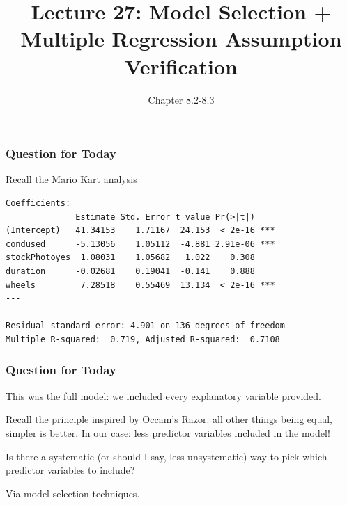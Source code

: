 \documentclass[handout]{beamer}
\title{Lecture 27: Model Selection + Multiple Regression Assumption Verification}
\author{Chapter 8.2-8.3}
\date{}
\newcommand{\blue}[1]{\textcolor{blue2}{#1}}
\begin{document}
\begin{frame}
\titlepage
\end{frame}


\begin{frame}[fragile]
\frametitle{Question for Today}
Recall the Mario Kart analysis

\begin{small}
\begin{verbatim}
Coefficients:
              Estimate Std. Error t value Pr(>|t|)    
(Intercept)   41.34153    1.71167  24.153  < 2e-16 ***
condused      -5.13056    1.05112  -4.881 2.91e-06 ***
stockPhotoyes  1.08031    1.05682   1.022    0.308    
duration      -0.02681    0.19041  -0.141    0.888    
wheels         7.28518    0.55469  13.134  < 2e-16 ***
---

Residual standard error: 4.901 on 136 degrees of freedom
Multiple R-squared:  0.719,	Adjusted R-squared:  0.7108 
\end{verbatim}
\end{small}

\end{frame}


\begin{frame}[fragile]
\frametitle{Question for Today}
This was the \blue{full model}:  we included every explanatory variable provided.

\pause
\vspace{0.5cm}

Recall the principle inspired by Occam's Razor: \blue{all other things being equal, simpler is better}.  In our case:  less predictor variables included in the model!


\pause\vspace{0.5cm}

Is there a systematic (or should I say, less unsystematic) way to pick which predictor variables to include?  

\vspace{0.5cm}

\pause Via \blue{model selection} techniques.  

\end{frame}
\end{document}
